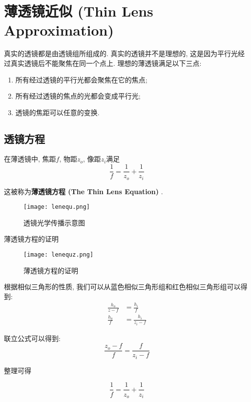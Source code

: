 \section{薄透镜近似 (Thin Lens Approximation) }

真实的透镜都是由透镜组所组成的. 真实的透镜并不是理想的, 这是因为平行光经过真实透镜后不能聚焦在同一个点上. 理想的薄透镜满足以下三点: 
\begin{enumerate}
	\item 所有经过透镜的平行光都会聚焦在它的焦点; 
	\item 所有经过透镜的焦点的光都会变成平行光; 
	\item 透镜的焦距可以任意的变换. 
\end{enumerate}

\subsection{透镜方程}

在薄透镜中, 焦距$f$, 物距$z_o$, 像距$z_i$满足
\begin{equation}
	\frac{1}{f}=\frac{1}{z_o}+\frac{1}{z_i}
\end{equation}

这被称为\textbf{薄透镜方程 (The Thin Lens Equation) }. 

\begin{figure}[H]
	\centering
	\texttt{[image: lenequ.png]}
	\caption{透镜光学传播示意图}
	\label{fig:lenequ}
\end{figure}

\begin{titledbox}{薄透镜方程的证明}
	
	\begin{figure}[H]
		\centering
		\texttt{[image: lenequz.png]}
		\caption{薄透镜方程的证明}
		\label{fig:lenequz}
	\end{figure}

根据相似三角形的性质, 我们可以从蓝色相似三角形组和红色相似三角形组可以得到: 
\begin{equation}
	\begin{split}
		\frac{h_o}{z-f}&=\frac{h_i}{f}\\
		\frac{h_o}{f}&=\frac{h_i}{z_i-f}
	\end{split}
\end{equation}

联立公式可以得到: 
\begin{equation}
	\frac{z_o-f}{f}=\frac{f}{z_i-f}
\end{equation}

整理可得

\begin{equation}
	\frac{1}{f}=\frac{1}{z_o}+\frac{1}{z_i}
\end{equation}
	
\end{titledbox}

